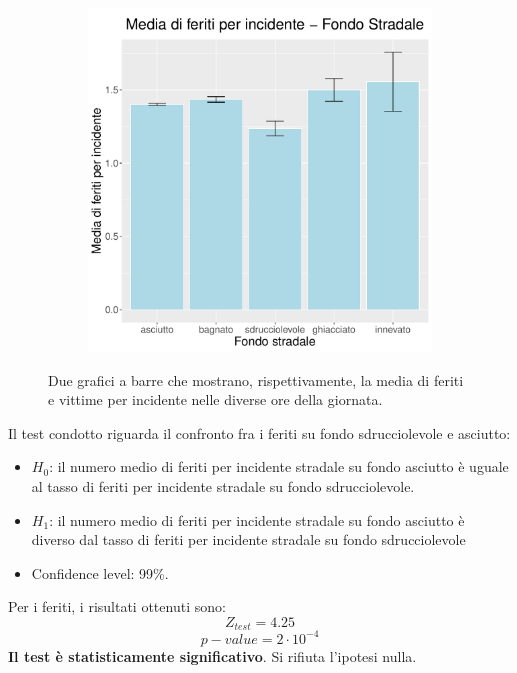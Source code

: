\documentclass[12pt,a4paper,final,oneside]{article}			%
\begin{document}
\begin{figure}[h]
\begin{subfigure}{0.4\textwidth}
                \includegraphics[scale=0.4]{../results/media_feriti_per_incidente_fondo.pdf}
            \end{subfigure}
            \caption{Due grafici a barre che mostrano, rispettivamente, la media di feriti e vittime per incidente nelle diverse ore della giornata.}
            \label{Fig: fondo_stradale_morti_feriti}
        \end{figure}
        Il test condotto riguarda il confronto fra i feriti su fondo sdrucciolevole e asciutto:
        \begin{itemize}
            \item $H_0$: il numero medio di feriti per incidente stradale su fondo asciutto è uguale al tasso di feriti per incidente stradale su fondo sdrucciolevole.
            \item $H_1$: il numero medio di feriti per incidente stradale su fondo asciutto è diverso dal tasso di feriti per incidente stradale su fondo sdrucciolevole
            \item Confidence level: 99\%.
        \end{itemize}
        Per i feriti, i risultati ottenuti sono:
        \[
            Z_{test} = 4.25
        \]
        \[
            p-value = 2\cdot10 ^ {-4}
        \]
        \textbf{Il test è statisticamente significativo}. Si rifiuta l’ipotesi nulla.
        
\end{document}
